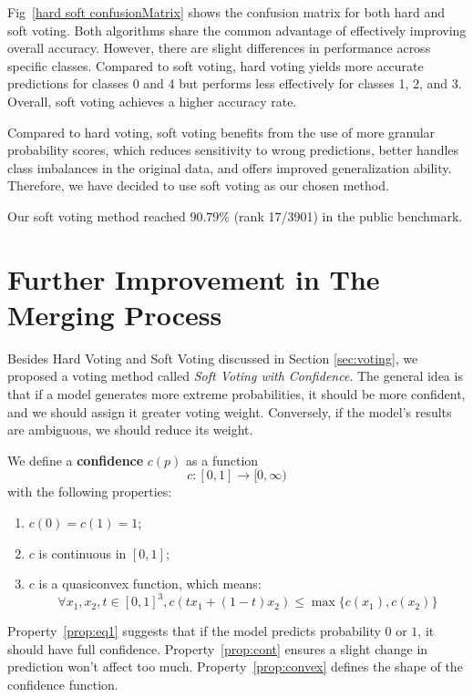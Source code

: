 Fig~\ref{hard soft confusionMatrix} shows the confusion matrix for both hard and soft voting. Both algorithms share the common advantage of effectively improving overall accuracy. However, there are slight differences in performance across specific classes. Compared to soft voting, hard voting yields more accurate predictions for classes 0 and 4 but performs less effectively for classes 1, 2, and 3. Overall, soft voting achieves a higher accuracy rate.

Compared to hard voting, soft voting benefits from the use of more granular probability scores, which reduces sensitivity to wrong predictions, better handles class imbalances in the original data, and offers improved generalization ability. Therefore, we have decided to use soft voting as our chosen method.

Our soft voting method reached $90.79\%$ (rank 17/3901) in the public benchmark.

\section{Further Improvement in The Merging Process}

Besides Hard Voting and Soft Voting discussed in Section \ref{sec:voting}, we proposed a voting method called \textit{Soft Voting with Confidence}. The general idea is that if a model generates more extreme probabilities, it should be more confident, and we should assign it greater voting weight. Conversely, if the model's results are ambiguous, we should reduce its weight.

We define a \textbf{confidence} $c(p)$ as a function
\begin{equation}
    c: [0, 1] \to [0,\infty)
\end{equation}
with the following properties:
\begin{enumerate}
    \item $c(0) = c(1) = 1$;\label{prop:eq1}
    \item $c$ is continuous in $[0, 1]$;\label{prop:cont}
    \item $c$ is a quasiconvex function, which means:\begin{equation}
        \forall x_1, x_2, t\in [0, 1]^3, c(tx_1 + (1-t)x_2)\le \max\{c(x_1), c(x_2)\}
    \end{equation}\label{prop:convex}
\end{enumerate}
Property~\ref{prop:eq1} suggests that if the model predicts probability $0$ or $1$, it should have full confidence. Property~\ref{prop:cont} ensures a slight change in prediction won't affect too much. Property~\ref{prop:convex} defines the shape of the confidence function.

